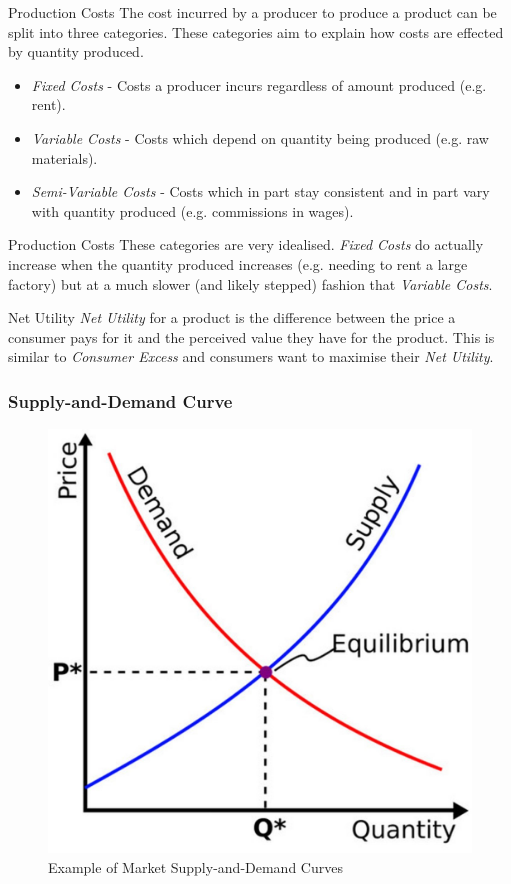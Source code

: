 \documentclass[11pt,a4paper]{article}
\begin{document}
  \begin{definition}{Production Costs}
    The cost incurred by a producer to produce a product can be split into three categories. These categories aim to explain how costs are effected by quantity produced.
    \begin{itemize}
      \item \textit{Fixed Costs} - Costs a producer incurs regardless of amount produced (e.g. rent).
      \item \textit{Variable Costs} - Costs which depend on quantity being produced (e.g. raw materials).
      \item \textit{Semi-Variable Costs} - Costs which in part stay consistent and in part vary with quantity produced (e.g. commissions in wages).
    \end{itemize}
  \end{definition}

  \begin{remark}{Production Costs}
    These categories are very idealised. \textit{Fixed Costs} do actually increase when the quantity produced increases (e.g. needing to rent a large factory) but at a much slower (and likely stepped) fashion that \textit{Variable Costs}.
  \end{remark}

  \begin{definition}{Net Utility}
    \textit{Net Utility} for a product is the difference between the price a consumer pays for it and the perceived value they have for the product. This is similar to \textit{Consumer Excess} and consumers want to maximise their \textit{Net Utility}.
  \end{definition}

\subsubsection{Supply-and-Demand Curve} \label{sec_SupplyAndDemandCurve}

  \begin{figure}[ht!]
    \centering
    \includegraphics[width=.3\textwidth]{SupplyAndDemandCurve.jpg}
    \caption{Example of Market Supply-and-Demand Curves}
    \label{fig_SupplyAndDemandCurve}
  \end{figure}
\end{document}
